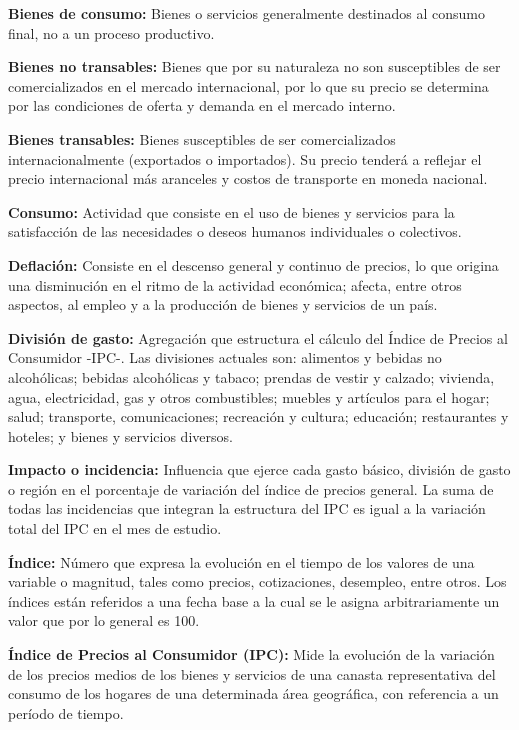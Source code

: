 {\setlength{\parindent}{0cm} 
\textbf{Bienes de consumo:} Bienes o servicios generalmente destinados al consumo final, no a un proceso productivo.

\textbf{Bienes no transables:} Bienes que por su naturaleza no son susceptibles de ser comercializados en el mercado internacional, por lo que su precio se determina por las condiciones de oferta y demanda en el mercado interno.

\textbf{Bienes transables:} Bienes susceptibles de ser comercializados internacionalmente (exportados o importados). Su precio tenderá a reflejar el precio internacional más aranceles y costos de transporte en moneda nacional.

\textbf{Consumo:} Actividad que consiste en el uso de bienes y servicios para la satisfacción de las necesidades o deseos humanos individuales o colectivos.

\textbf{Deflación:} Consiste en el descenso general y continuo de precios, lo que origina una disminución en el ritmo de la actividad económica; afecta, entre otros aspectos, al empleo y a la producción de bienes y servicios de un país.

\textbf{División de gasto:} Agregación que estructura el cálculo del Índice de Precios al Consumidor -IPC-. Las divisiones actuales son: alimentos y bebidas no alcohólicas; bebidas alcohólicas y tabaco; prendas de vestir y calzado; vivienda, agua, electricidad, gas y otros combustibles; muebles y artículos para el hogar; salud; transporte, comunicaciones; recreación y cultura; educación; restaurantes y hoteles; y bienes y servicios diversos.

\textbf{Impacto o incidencia:} Influencia que ejerce cada gasto básico, división de gasto o región en el porcentaje de variación del índice de precios general. La suma de todas las incidencias que integran la estructura del IPC es igual a la variación total del IPC en el mes de estudio.

\textbf{Índice:} Número que expresa la evolución en el tiempo de los valores de una variable o magnitud, tales como precios, cotizaciones, desempleo, entre otros. Los índices están referidos a una fecha base a la cual se le asigna arbitrariamente un valor que por lo general es 100.

\textbf{Índice de Precios al Consumidor (IPC):} Mide la evolución de la variación de los precios medios de los bienes y servicios de una canasta representativa del consumo de los hogares de una determinada área geográfica, con referencia a un período de tiempo.

}
